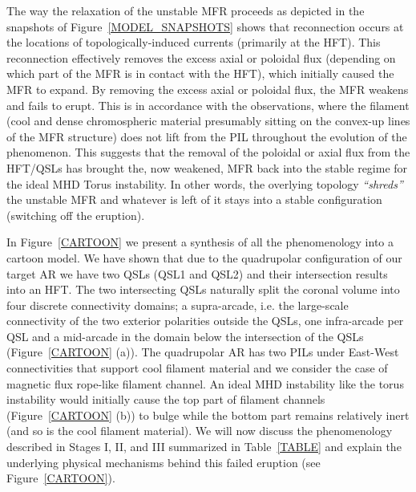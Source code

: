 \documentclass[preprint]{aastex}
\begin{document}
The way the relaxation of the unstable MFR proceeds as depicted in the snapshots of Figure~\ref{MODEL_SNAPSHOTS} shows that reconnection occurs at the locations of topologically-induced currents (primarily at the HFT). This reconnection effectively removes the excess axial or poloidal flux (depending on which part of the MFR is in contact with the HFT), which initially caused the MFR to expand. By removing the excess axial or poloidal flux, the MFR weakens and fails to erupt. This is in accordance with the observations, where the filament (cool and dense chromospheric material presumably sitting on the convex-up lines of the MFR structure) does not lift from the PIL throughout the evolution of the phenomenon. This suggests that the removal of the poloidal or axial flux from the HFT/QSLs has brought the, now weakened, MFR back into the stable regime for the ideal MHD Torus instability. In other words, the overlying topology \emph{``shreds''} the unstable MFR and whatever is left of it stays into a stable configuration (switching off the eruption). 

In Figure~\ref{CARTOON} we present a synthesis of all the phenomenology into a cartoon model. We have shown that due to the quadrupolar configuration of our target AR we have two QSLs (QSL1 and QSL2) and their intersection results into an HFT. The two intersecting QSLs naturally split the coronal volume into four discrete connectivity domains; a supra-arcade, i.e. the large-scale connectivity of the two exterior polarities outside the QSLs, one infra-arcade per QSL and a mid-arcade in the domain below the intersection of the QSLs (Figure~\ref{CARTOON} (a)). The quadrupolar AR has two PILs under East-West connectivities that support cool filament material and we consider the case of magnetic flux rope-like filament channel. An ideal MHD instability like the torus instability would initially cause the top part of filament channels (Figure~\ref{CARTOON} (b)) to bulge while the bottom part remains relatively inert (and so is the cool filament material). We will now discuss the phenomenology described in Stages I, II, and III summarized in Table~\ref{TABLE} and explain the underlying physical mechanisms behind this failed eruption (see Figure~\ref{CARTOON}).
\end{document}
